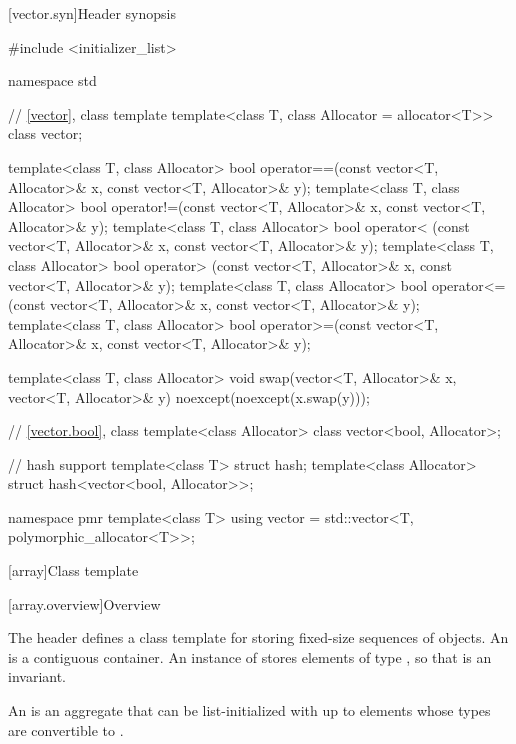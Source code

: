 [vector.syn]{Header  synopsis}

%

\begin{codeblock}
#include <initializer_list>

namespace std {
  // \ref{vector}, class template 
  template<class T, class Allocator = allocator<T>> class vector;

  template<class T, class Allocator>
    bool operator==(const vector<T, Allocator>& x, const vector<T, Allocator>& y);
  template<class T, class Allocator>
    bool operator!=(const vector<T, Allocator>& x, const vector<T, Allocator>& y);
  template<class T, class Allocator>
    bool operator< (const vector<T, Allocator>& x, const vector<T, Allocator>& y);
  template<class T, class Allocator>
    bool operator> (const vector<T, Allocator>& x, const vector<T, Allocator>& y);
  template<class T, class Allocator>
    bool operator<=(const vector<T, Allocator>& x, const vector<T, Allocator>& y);
  template<class T, class Allocator>
    bool operator>=(const vector<T, Allocator>& x, const vector<T, Allocator>& y);

  template<class T, class Allocator>
    void swap(vector<T, Allocator>& x, vector<T, Allocator>& y)
      noexcept(noexcept(x.swap(y)));

  // \ref{vector.bool}, class 
  template<class Allocator> class vector<bool, Allocator>;

  // hash support
  template<class T> struct hash;
  template<class Allocator> struct hash<vector<bool, Allocator>>;

  namespace pmr {
    template<class T>
      using vector = std::vector<T, polymorphic_allocator<T>>;
  }
}
\end{codeblock}

[array]{Class template }
%

[array.overview]{Overview}

\pnum
{}%
The header  defines a class template for storing fixed-size
sequences of objects.
An  is a contiguous container.
An instance of  stores  elements of type ,
so that  is an invariant.

\pnum
{}%
%
An  is an aggregate that can be
list-initialized with up
to  elements whose types are convertible to .

